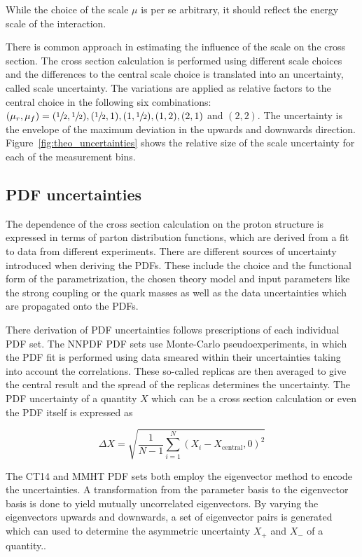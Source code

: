 While the choice of the scale $\mu$ is per se arbitrary, it should reflect the
energy scale of the interaction. 

There is common approach in estimating the influence of the scale on the cross
section. The cross section calculation is performed using different scale
choices and the differences to the central scale choice is translated into an
uncertainty, called scale uncertainty. The variations are applied as relative
factors to the central choice in the following six combinations: $(\mu_r, \mu_f) =
(\sfrac{1}{2}, \sfrac{1}{2}), (\sfrac{1}{2}, 1), (1, \sfrac{1}{2}), (1, 2), (2,
1)$ and $(2, 2)$. The uncertainty is the envelope of the maximum deviation in
the upwards and downwards direction.  Figure~\ref{fig:theo_uncertainties} shows
the relative size of the scale uncertainty for each of the measurement bins.

\subsection{PDF uncertainties}

The dependence of the cross section calculation on the proton structure is
expressed in terms of parton distribution functions, which are derived from a
fit to data from different experiments. There are different sources of
uncertainty introduced when deriving the PDFs. These include the choice and the
functional form of the parametrization, the chosen theory model and input
parameters like the strong coupling or the quark masses as well as the data
uncertainties which are propagated onto the PDFs.

There derivation of PDF uncertainties follows prescriptions of each individual
PDF set. The NNPDF PDF sets use Monte-Carlo pseudoexperiments, in which the PDF
fit is performed using data smeared within their uncertainties taking into
account the correlations. These so-called replicas are then averaged to give the
central result and the spread of the replicas determines the uncertainty. The
PDF uncertainty of a quantity $X$ which can be a cross section calculation or
even the PDF itself is expressed as

\begin{equation*}
    \Delta X = \sqrt{\frac{1}{N-1} \sum_{i=1}^N \left( X_{i} - X_{\mathrm{central}} , 0 \right)^2}
\end{equation*}

The CT14 and MMHT PDF sets both employ the eigenvector method to encode the
uncertainties. A transformation from the parameter basis to the eigenvector
basis is done to yield mutually uncorrelated eigenvectors. By varying the
eigenvectors upwards and downwards, a set of eigenvector pairs is generated which can used to
determine the asymmetric uncertainty $X_+$ and $X_-$ of a quantity..

